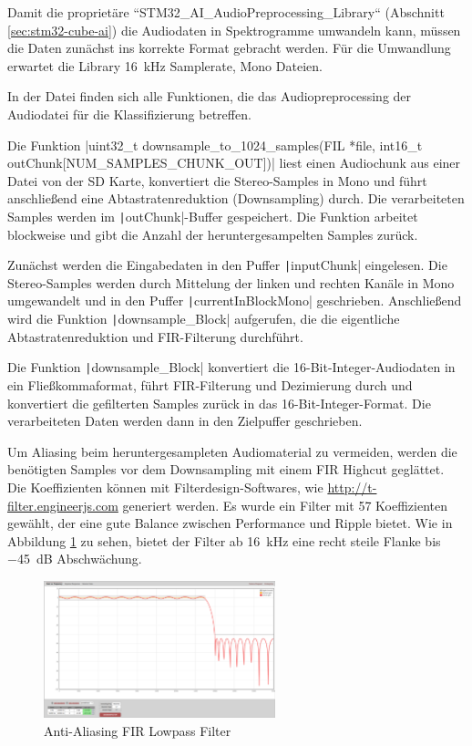 Damit die proprietäre ``STM32\_AI\_AudioPreprocessing\_Library`` (Abschnitt \ref{sec:stm32-cube-ai}) die Audiodaten in Spektrogramme umwandeln kann, müssen die Daten zunächst ins korrekte Format gebracht werden. Für die Umwandlung erwartet die Library \SI{16}{\kilo\hertz} Samplerate, Mono Dateien.

In der Datei
finden sich alle Funktionen, die das Audiopreprocessing der Audiodatei für die Klassifizierung betreffen.

Die Funktion 
|uint32_t downsample_to_1024_samples(FIL *file, int16_t outChunk[NUM_SAMPLES_CHUNK_OUT])|
liest einen Audiochunk aus einer Datei von der SD Karte, konvertiert die Stereo-Samples in Mono und führt anschließend eine Abtastratenreduktion (Downsampling) durch. Die verarbeiteten Samples werden im \texttt|outChunk|-Buffer gespeichert. Die Funktion arbeitet blockweise und gibt die Anzahl der heruntergesampelten Samples zurück. 

Zunächst werden die Eingabedaten in den Puffer \texttt|inputChunk| eingelesen. Die Stereo-Samples werden durch Mittelung der linken und rechten Kanäle in Mono umgewandelt und in den Puffer \texttt|currentInBlockMono| geschrieben. Anschließend wird die Funktion \texttt|downsample_Block| aufgerufen, die die eigentliche Abtastratenreduktion und FIR-Filterung durchführt.

Die Funktion \texttt|downsample_Block| konvertiert die 16-Bit-Integer-Audiodaten in ein Fließkommaformat, führt FIR-Filterung und Dezimierung durch und konvertiert die gefilterten Samples zurück in das 16-Bit-Integer-Format. Die verarbeiteten Daten werden dann in den Zielpuffer geschrieben.

Um Aliasing beim heruntergesampleten Audiomaterial zu vermeiden, werden die benötigten Samples vor dem Downsampling mit einem FIR Highcut geglättet. 
Die Koeffizienten können mit Filterdesign-Softwares, wie \url{http://t-filter.engineerjs.com} generiert werden. Es wurde ein Filter mit 57 Koeffizienten gewählt, der eine gute Balance zwischen Performance und Ripple bietet. 
Wie in Abbildung \ref{fig:fir-filter} zu sehen, bietet der Filter ab \SI{16}{\kilo\hertz} eine recht steile Flanke bis \SI{-45}{\deci\bel} Abschwächung.

\begin{figure}[h!]
	\centering
	\includegraphics[width=0.6\textwidth]{images/08_durchfuehrung/audio/fir_lowpass.png}
	\caption{Anti-Aliasing FIR Lowpass Filter}
	\label{fig:fir-filter}
\end{figure}

